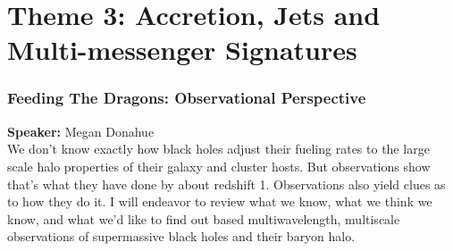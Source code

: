 \hypertarget{abs-day-wednesday}{}

\section*{Theme 3: Accretion, Jets and Multi-messenger Signatures}

\hypertarget{abs-4}{}
\subsubsection*{Feeding The Dragons: Observational Perspective}
\textbf{Speaker:} Megan Donahue \invitedbadge{}\\

We don’t know exactly how black holes adjust their fueling rates to the large scale halo properties of their galaxy and cluster hosts. But
observations show that’s what they have done by about redshift 1. Observations also yield clues as to how they do it. I will endeavor
to review what we know, what we think we know, and what we’d like to find out based multiwavelength, multiscale observations of supermassive black holes and their baryon halo.

\hypertarget{abs-33}{}
